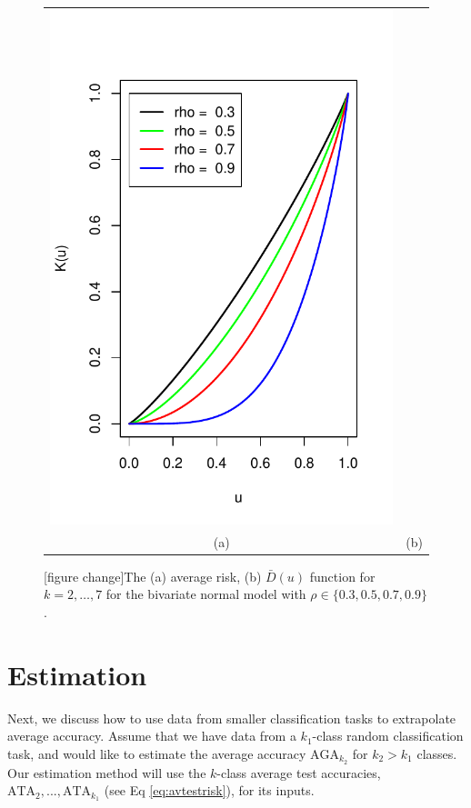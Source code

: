 \documentclass[twoside,11pt]{article}
\begin{document}
\begin{figure}[h]
\begin{tabular}{cc}
\includegraphics[scale = 0.45, clip = true, trim = 0.05in 0 0.2in 0.6in]{illus_rhos_Kfunc.pdf} \\
(a) & (b) 
\end{tabular}

\caption{
[figure change]The (a) average risk, (b) $\bar{D}(u)$ function for $k = 2,\hdots, 7$ for the bivariate normal model with $\rho \in \{0.3, 0.5, 0.7, 0.9\}$.
}\label{fig:toy4}
\end{figure}

\section{Estimation}\label{sec:extrapolation_estimation}

Next, we discuss how to use data from smaller classification tasks to extrapolate average accuracy.
Assume that we have data from a $k_1$-class random classification task, 
and would like to estimate the average accuracy $\text{AGA}_{k_2}$ for $k_2>k_1$ classes.
Our estimation method will use the $k$-class average test accuracies, $\text{ATA}_2,...,\text{ATA}_{k_1}$ (see Eq \ref{eq:avtestrisk}), for its inputs.
\end{document}
